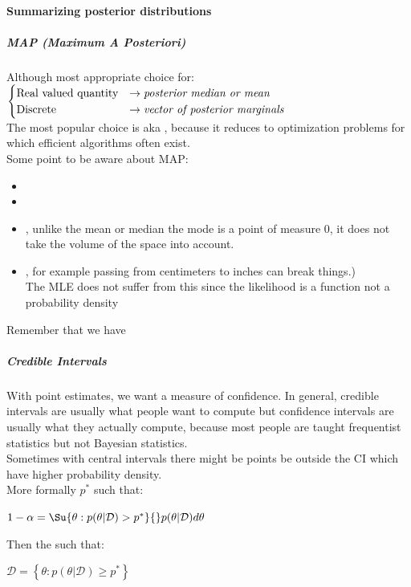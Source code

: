 \paragraph{Summarizing posterior distributions}
\subparagraph{MAP (Maximum A Posteriori)}
Although most appropriate choice for:\\
$
\begin{cases}
	\text{Real valued quantity} &\rightarrow \text{\emph{posterior median or mean}}\\
	\text{Discrete} &\rightarrow \text{\emph{vector of posterior marginals}}
\end{cases}
$\\
The most popular choice is  aka , because it reduces to
optimization problems for which efficient algorithms often exist.\\
Some point to be aware about MAP:
\begin{itemize}
	\item {}
	\item {}
	\item {}, unlike the mean or median the mode is a
		point of measure 0, it does not take the volume of the space into account.
	\item {}, for example 
		passing from centimeters to inches can break things.)\\ The MLE does not
		suffer from this since the likelihood is a function not a probability
		density
\end{itemize}

Remember that we have 

\subparagraph{Credible Intervals}
With point estimates, we want a measure of confidence. 
In general, credible intervals are usually what people want to compute but confidence
intervals are usually what they actually compute, because most people are taught 
frequentist statistics but not Bayesian statistics.\\
Sometimes with central intervals there might be points be outside the CI which have higher
probability density.\\
More formally $p^{*}$ such that: 
\begin{center}
	$1-\alpha = 
	\Su{{\theta:p(\theta|\mathcal{D})>p^{*}}}{}p(\theta|\mathcal{D})d\theta$
\end{center}
Then the  such that:
\begin{center}
	$\mathcal{D}=\left\{\theta: p(\theta|\mathcal{D})\geq p^{*}\right\}$
\end{center}

